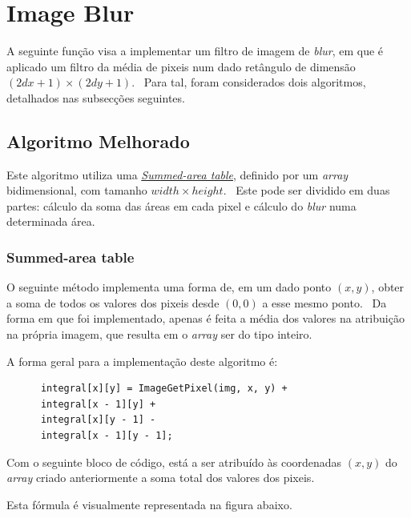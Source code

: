 
\fontsize{12}{12}\selectfont
\section{Image Blur}\label{sec:imageblur}
    \par A seguinte função visa a implementar um filtro de imagem de \textit{blur}, em que é aplicado um filtro da média de pixeis num dado retângulo de dimensão $(2dx + 1) \times (2dy + 1)$. \ Para tal, foram considerados dois algoritmos, detalhados nas subsecções seguintes.

\subsection{Algoritmo Melhorado}\label{subsec:blur1}
    \par Este algoritmo utiliza uma \href{https://en.wikipedia.org/wiki/Summed-area_table}{\textit{Summed-area table}}, definido por um \textit{array} bidimensional, com tamanho $width \times height$. \ Este pode ser dividido em duas partes: cálculo da soma das áreas em cada pixel e cálculo do \textit{blur} numa determinada área.

\subsubsection{Summed-area table}
    \par O seguinte método implementa uma forma de, em um dado ponto $(x,y)$, obter a soma de todos os valores dos pixeis desde $(0,0)$ a esse mesmo ponto. \ Da forma em que foi implementado, apenas é feita a média dos valores na atribuição na própria imagem, que resulta em o \textit{array} ser do tipo inteiro.

    \par A forma geral para a implementação deste algoritmo é:

    \begin{lstlisting}
      integral[x][y] = ImageGetPixel(img, x, y) +
      integral[x - 1][y] +
      integral[x][y - 1] -
      integral[x - 1][y - 1];    
    \end{lstlisting}

    \par Com o seguinte bloco de código, está a ser atribuído às coordenadas $(x,y)$ do \textit{array} criado anteriormente a soma total dos valores dos pixeis.
    \par Esta fórmula é visualmente representada na figura abaixo.

